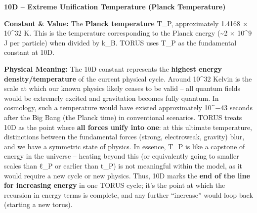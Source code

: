 \textbf{10D -- Extreme Unification Temperature (Planck Temperature)}

\textbf{Constant \& Value:} The \textbf{Planck temperature} T\_P,
approximately 1.4168 × 10\^{}32 K​. This is the temperature
corresponding to the Planck energy (\textasciitilde{}2 × 10\^{}9 J per
particle) when divided by k\_B. TORUS uses T\_P as the fundamental
constant at 10D.

\textbf{Physical Meaning:} The 10D constant represents the
\textbf{highest energy density/temperature} of the current physical
cycle. Around 10\^{}32 Kelvin is the scale at which our known physics
likely ceases to be valid -- all quantum fields would be extremely
excited and gravitation becomes fully quantum. In cosmology, such a
temperature would have existed approximately 10\^{}−43 seconds after the
Big Bang (the Planck time) in conventional scenarios. TORUS treats 10D
as the point where \textbf{all forces unify into one}: at this ultimate
temperature, distinctions between the fundamental forces (strong,
electroweak, gravity) blur, and we have a symmetric state of physics​.
In essence, T\_P is like a capstone of energy in the universe -- heating
beyond this (or equivalently going to smaller scales than ℓ\_P or
earlier than t\_P) is not meaningful within the model, as it would
require a new cycle or new physics. Thus, 10D marks the \textbf{end of
the line for increasing energy} in one TORUS cycle; it's the point at
which the recursion in energy terms is complete, and any further
``increase'' would loop back (starting a new torus).

